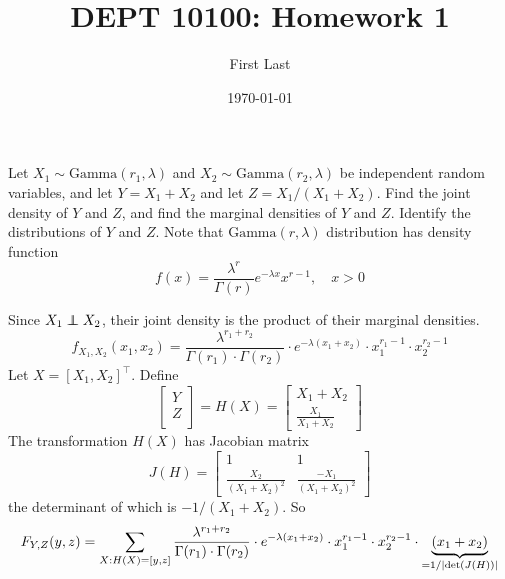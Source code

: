 \documentclass[10pt]{extarticle}
\title{DEPT 10100: Homework 1}
\author{First Last}
\date{\today}
\begin{document}
\begin{question}[10pts]
    Let $X_1 \sim \text{Gamma}(r_1, \lambda)$ and $X_2 \sim \text{Gamma}(r_2, \lambda)$ be independent random variables, and let $Y = X_1 + X_2$ and let $Z = X_1 / (X_1 + X_2)$.
    Find the joint density of $Y$ and $Z$, and find the marginal densities of $Y$ and $Z$. Identify the distributions of $Y$ and $Z$. Note that $\text{Gamma}(r, \lambda)$ distribution has density function
        \begin{equation*}
            f(x)=\frac{\lambda^{r}}{\Gamma(r)} e^{-\lambda x} x^{r-1}, \quad x>0
        \end{equation*}
\end{question}
\begin{ans}
    Since $X_1 \perp \!\!\!\! \perp X_2$, their joint density is the product of their marginal densities.
    \begin{equation}
        f_{X_1, X_2}(x_1, x_2) = \frac{\lambda^{r_1 + r_2}}{\Gamma(r_1) \cdot \Gamma(r_2)}\cdot  e^{-\lambda(x_1 + x_2)} \cdot x_1^{r_1 - 1} \cdot x_2^{r_2 - 1}
    \end{equation}
    Let $X = [X_1, X_2]^\intercal$. Define
    \begin{equation}
        \begin{bmatrix}
            Y \\
            Z \\
        \end{bmatrix} = H(X) = \begin{bmatrix}
            X_1 + X_2 \\
            \frac{X_1}{X_1 + X_2}
        \end{bmatrix}
    \end{equation}
    The transformation $H(X)$ has Jacobian matrix
    \begin{equation}
        J(H) = \begin{bmatrix}
            1 & 1 \\
            \frac{X_2}{(X_1 + X_2)^2} & \frac{-X_1}{(X_1 + X_2)^2}
        \end{bmatrix}
    \end{equation}
    the determinant of which is $-1 / (X_1 + X_2)$. So
    \begin{align}
        F_{Y, Z}(y, z) &= \sum_{X : H(X) = [y, z]} \frac{\lambda^{r_1 + r_2}}{\Gamma(r_1) \cdot \Gamma(r_2)}\cdot  e^{-\lambda(x_1 + x_2)} \cdot x_1^{r_1 - 1} \cdot x_2^{r_2 - 1} \cdot \underbrace{(x_1 + x_2)}_{=1 / \abs{\det(J(H))}} \\

\end{align}
\end{ans}
\end{document}
